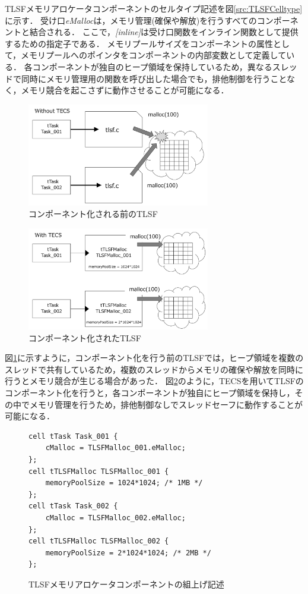\documentclass[submit,techrep]{ipsj_v2/UTF8/ipsj}
\begin{document}
TLSFメモリアロケータコンポーネントのセルタイプ記述を図\ref{src:TLSFCelltype}に示す．
受け口{\it eMalloc}は，メモリ管理(確保や解放)を行うすべてのコンポーネントと結合される．
ここで，{\it [inline]}は受け口関数をインライン関数として提供するための指定子である．
メモリプールサイズをコンポーネントの属性として，メモリプールへのポインタをコンポーネントの内部変数として定義している．
各コンポーネントが独自のヒープ領域を保持しているため，異なるスレッドで同時にメモリ管理用の関数を呼び出した場合でも，排他制御を行うことなく，メモリ競合を起こさずに動作させることが可能になる．

\begin{figure}[t]
    \centering
    \includegraphics[width=8cm,clip]{figure/WithoutTECS.pdf}
    \caption{コンポーネント化される前のTLSF}
    \label{fig:WithoutTECS}
\end{figure}

\begin{figure}[t]
    \centering
    \includegraphics[width=8cm,clip]{figure/WithTECS.pdf}
    \caption{コンポーネント化されたTLSF}
    \label{fig:WithTECS}
\end{figure}

図\ref{fig:WithoutTECS}に示すように，コンポーネント化を行う前のTLSFでは，ヒープ領域を複数のスレッドで共有しているため，複数のスレッドからメモリの確保や解放を同時に行うとメモリ競合が生じる場合があった．
図\ref{fig:WithTECS}のように，TECSを用いてTLSFのコンポーネント化を行うと，各コンポーネントが独自にヒープ領域を保持し，その中でメモリ管理を行うため，排他制御なしでスレッドセーフに動作することが可能になる．

\begin{figure}[t]
\centering
\begin{lstlisting}
cell tTask Task_001 {
    cMalloc = TLSFMalloc_001.eMalloc;
};
cell tTLSFMalloc TLSFMalloc_001 {
    memoryPoolSize = 1024*1024; /* 1MB */
};
cell tTask Task_002 {
    cMalloc = TLSFMalloc_002.eMalloc;
};
cell tTLSFMalloc TLSFMalloc_002 {
    memoryPoolSize = 2*1024*1024; /* 2MB */
};
\end{lstlisting}
\caption{TLSFメモリアロケータコンポーネントの組上げ記述}  
\label{src:TLSFBuild}
\end{figure}
\end{document}
